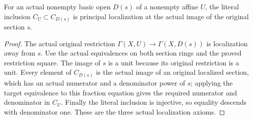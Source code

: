 \begin{theorem}\label{thm:sc0-scheme-sections-function-field-basic-localization}
\leanok
{}
For an actual nonempty basic open $D(s)$ of a nonempty affine $U$,
the literal inclusion $C_U\subset C_{D(s)}$ is principal localization
at the actual image of the original section $s$.
\end{theorem}
\begin{proof}
The actual original restriction $\Gamma(X,U)\to\Gamma(X,D(s))$ is
localization away from $s$. Use the actual equivalences on both
section rings and the proved restriction square. The image of $s$
is a unit because its original restriction is a unit. Every element
of $C_{D(s)}$ is the actual image of an original localized section,
which has an actual numerator and a denominator power of $s$;
applying the target equivalence to this fraction equation gives
the required numerator and denominator in $C_U$. Finally the literal
inclusion is injective, so equality descends with denominator one.
These are the three actual localization axioms.
\end{proof}
